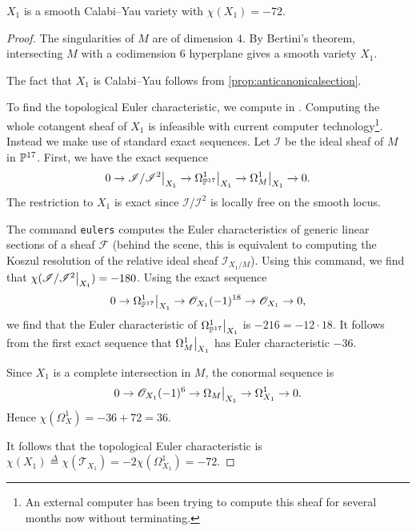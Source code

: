 \begin{proposition}
\label{prop:x1}
$X_1$ is a smooth Calabi--Yau variety with $\chi(X_1)=-72$.
\end{proposition}
\begin{proof}
The singularities of $M$ are of dimension $4$. By Bertini's theorem, intersecting $M$ with a codimension $6$ hyperplane gives a smooth variety $X_1$.

The fact that $X_1$ is Calabi--Yau follows from \cref{prop:anticanonicalsection}.

To find the topological Euler characteristic, we compute in \MM. Computing the whole cotangent sheaf of $X_1$ is infeasible with current computer technology\footnote{An external computer has been trying to compute this sheaf for several months now without terminating.}. Instead we make use of standard exact sequences. Let $\mathscr I$ be the ideal sheaf of $M$ in $\P^{17}$. First, we have the exact sequence
$$
0 \to \restr{\mathscr I/\mathscr I^2}{X_1} \to \restr{\Omega_{\P^{17}}^1}{X_1} \to \restr{\Omega_M^1}{X_1} \to 0.
$$
The restriction to ${X_1}$ is exact since $\mathscr I/\mathscr I^2$ is locally free on the smooth locus.

The \MM command \texttt{eulers} computes the Euler characteristics of generic linear sections of a sheaf $\mathscr F$ (behind the scene, this is equivalent to computing the Koszul resolution of the relative ideal sheaf $\mathscr I_{X_1/M}$). Using this command, we find that $\chi(\restr{\mathscr I/\mathscr I^2}{X_1})=-180$. Using the exact sequence
$$
0 \to \restr{\Omega_{\P^{17}}^1}{X_1} \to \OO_{X_1}(-1)^{18} \to \OO_{X_1} \to 0,
$$
we find that the Euler characteristic of $\restr{\Omega_{\P^{17}}^1}{X_1}$ is $-216=-12\cdot 18$. It follows from the first exact sequence that $\restr{\Omega_M^1}{X_1}$ has Euler characteristic $-36$.

Since $X_1$ is a complete intersection in $M$, the conormal sequence is
$$
0 \to \OO_{X_1}(-1)^6 \to \restr{\Omega_M}{X_1}  \to \Omega_{X_1}^1 \to 0.
$$
Hence $\chi(\Omega_X^1) = -36+72 = 36$.

It follows that the topological Euler characteristic is $\chi(X_1) \stackrel \Delta = \chi(\mathcal T_{X_1}) = -2\chi(\Omega_{X_1}^1)=-72$.
\end{proof}

